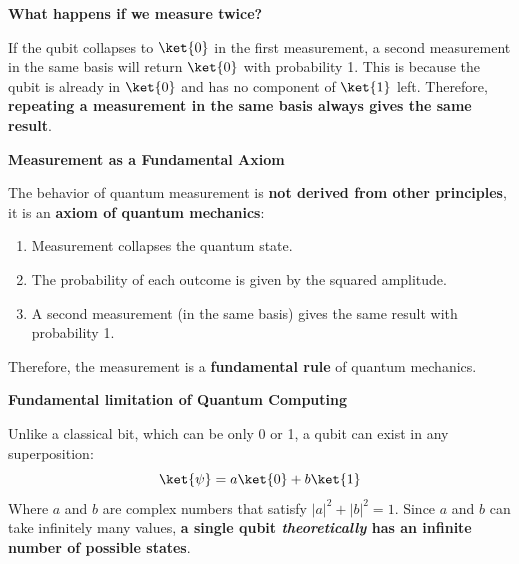 \begin{flushleft}
    \textcolor{Green3}{ \textbf{What happens if we measure twice?}}
\end{flushleft}
If the qubit collapses to $\ket{0}$ in the first measurement, a second measurement in the same basis will return $\ket{0}$ with probability 1. This is because the qubit is already in $\ket{0}$ and has no component of $\ket{1}$ left. Therefore, \textbf{repeating a measurement in the same basis always gives the same result}.

\highspace
\begin{flushleft}
    \textcolor{Red2}{ \textbf{Measurement as a Fundamental Axiom}}
\end{flushleft}
The behavior of quantum measurement is \textbf{not derived from other principles}, it is an \textbf{axiom of quantum mechanics}:
\begin{enumerate}
    \item Measurement collapses the quantum state.
    \item The probability of each outcome is given by the squared amplitude.
    \item A second measurement (in the same basis) gives the same result with probability 1.
\end{enumerate}
Therefore, the measurement is a \textbf{fundamental rule} of quantum mechanics.

\highspace
\begin{flushleft}
    \textcolor{Red2}{ \textbf{Fundamental limitation of Quantum Computing}}
\end{flushleft}
Unlike a classical bit, which can be only 0 or 1, a qubit can exist in any superposition:
\begin{equation*}
    \ket{\psi} = a \ket{0} + b \ket{1}
\end{equation*}
Where $a$ and $b$ are complex numbers that satisfy $\left|a\right|^{2} + \left|b\right|^{2} = 1$. Since $a$ and $b$ can take infinitely many values, \textbf{a single qubit \emph{theoretically} has an infinite number of possible states}.

